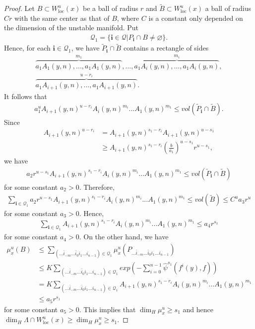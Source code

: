 \documentclass[11pt,a4paper]{amsart}
\theoremstyle{plain}
\theoremstyle{remark}
\begin{document}
\begin{proof}
		Let $B\subset W^{u}_{\text{loc}}(x)$ be a ball of radius $r$ and $\tilde{B}\subset W^{u}_{\text{loc}}(x)$ a ball of radius $Cr$ with the same center as that of $B$, where $C$ is a constant only depended on the dimension of the unstable manifold. Put
		\begin{align*}
			\mathcal{Q}_{1}=\{\mathbf{i}\in \mathcal{Q}|P_{\mathbf{i}}\cap B\neq \varnothing\}.
		\end{align*}
		Hence, for each $\mathbf{i}\in\mathcal{Q}_{1}$, we have $\tilde{P}_{\mathbf{i}}\cap \tilde{B}$ contains a rectangle of sides
		\begin{align*}
			\overbrace{a_{1}A_{1}(y,n),...,a_{1}A_{1}(y,n)}^{m_{1}},...,\overbrace{a_{1}A_{i}(y,n),...,a_{1}A_{i}(y,n)}^{m_{i}},\\
			\overbrace{a_{1}A_{i+1}(y,n),...,a_{1}A_{i+1}(y,n)}^{u-r_{i}}.
		\end{align*}
		It follows that
		\begin{align*}
			a_{1}^{u}A_{i+1}(y,n)^{u-r_{i}}A_{i}(y,n)^{m_{i}}...A_{1}(y,n)^{m_{1}}\leq vol (\tilde{P}_{\mathbf{i}}\cap \tilde{B}).
		\end{align*}
		Since
		\begin{align*}
			A_{i+1}(y,n)^{u-r_{i}}&=A_{i+1}(y,n)^{s_{1}-r_{i}}A_{i+1}(y,n)^{u-s_{1}}\\
			&\geq A_{i+1}(y,n)^{s_{1}-r_{i}}(\frac{b}{a_{1}})^{u-s_{1}}r^{u-s_{1}},
		\end{align*}
		we have
		\begin{align*}
			a_{2}r^{u-s_{1}}A_{i+1}(y,n)^{s_{1}-r_{i}}A_{i}(y,n)^{m_{i}}...A_{1}(y,n)^{m_{1}}\leq vol (\tilde{P}_{\mathbf{i}}\cap \tilde{B})
		\end{align*}
		for some constant $a_{2}>0$. Therefore,
		\begin{align*}
			\sum_{\mathbf{i}\in\mathcal{Q}_{1}}a_{2}r^{u-s_{1}}A_{i+1}(y,n)^{s_{1}-r_{i}}A_{i}(y,n)^{m_{i}}...A_{1}(y,n)^{m_{1}}\leq vol (\tilde{B})\leq C^{u}a_{3}r^{u}
		\end{align*}
		for some constant $a_{3}>0$. Hence,
		\begin{align*}
			\sum_{\mathbf{i}\in\mathcal{Q}_{1}}A_{i+1}(y,n)^{s_{1}-r_{i}}A_{i}(y,n)^{m_{i}}...A_{1}(y,n)^{m_{1}}\leq a_{4}r^{s_{1}}
		\end{align*}
		for some constant $a_{4}>0$.
		On the other hand, we have
		\begin{align*}
			\mu_{x}^{u}(B)&\leq \sum_{(...\bar{i}_{-m}...\bar{i}_{0}i_{1}...i_{n-1})\in\mathcal{Q}_{1}}\mu_{x}^{u}(P_{...\bar{i}_{-m}...\bar{i}_{0}i_{1}...i_{n-1}})\\
			&\leq K \sum_{(...\bar{i}_{-m}...\bar{i}_{0}i_{1}...i_{n-1})\in\mathcal{Q}_{1}} exp(-\sum_{i=0}^{n-1}\hat{\psi}^{s_{1}}(f^{i}(y),f))\\
			&=K \sum_{(...\bar{i}_{-m}...\bar{i}_{0}i_{1}...i_{n-1})\in\mathcal{Q}_{1}} A_{i+1}(y,n)^{s_{1}-r_{i}}A_{i}(y,n)^{m_{i}}...A_{1}(y,n)^{m_{1}}\\
			&\leq a_{5}r^{s_{1}}
		\end{align*}
		for some constant $a_{5}>0$. This implies that $\dim_{H}\mu_{x}^{u}\geq s_{1}$ and hence $\dim_{H}\Lambda\cap W^{u}_{\text{loc}}(x)\geq \dim_{H}\mu_{x}^{u}\geq s_{1}$.
	\end{proof}
	
\end{document}
